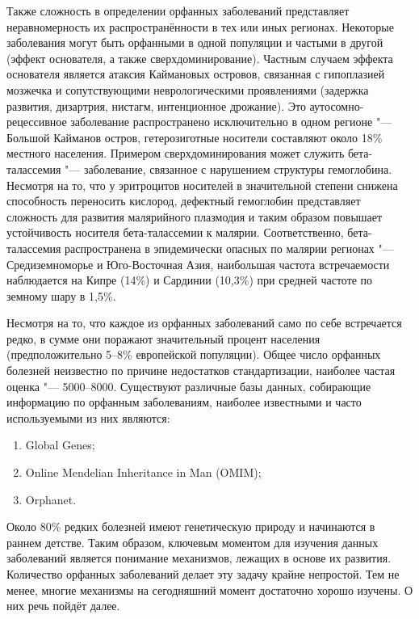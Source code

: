 \documentclass[a4paper,12pt]{article}
\begin{document}
Также сложность в определении орфанных заболеваний представляет неравномерность их распространённости в тех или иных регионах.
Некоторые заболевания могут быть орфанными в одной популяции и частыми в другой (эффект основателя, а также сверхдоминирование).
Частным случаем эффекта основателя является атаксия Каймановых островов, связанная с гипоплазией мозжечка и сопутствующими неврологическими проявлениями (задержка развития, дизартрия, нистагм, интенционное дрожание).
Это аутосомно-рецессивное заболевание распространено исключительно в одном регионе "--- Большой Кайманов остров, гетерозиготные носители составляют около 18\% местного населения\cite{Bomar_2003}.
Примером сверхдоминирования может служить бета-талассемия "--- заболевание, связанное с нарушением структуры гемоглобина.
Несмотря на то, что у эритроцитов носителей в значительной степени снижена способность переносить кислород, дефектный гемоглобин представляет сложность для развития малярийного плазмодия и таким образом повышает устойчивость носителя бета-талассемии к малярии\cite{Galanello_2010}.
Соответственно, бета-талассемия распространена в эпидемически опасных по малярии регионах "--- Средиземноморье и Юго-Восточная Азия, наибольшая частота встречаемости наблюдается на Кипре (14\%) и Сардинии (10,3\%) при средней частоте по земному шару в 1,5\%.

Несмотря на то, что каждое из орфанных заболеваний само по себе встречается редко, в сумме они поражают значительный процент населения (предположительно 5--8\% европейской популяции).
Общее число орфанных болезней неизвестно по причине недостатков стандартизации, наиболее частая оценка "--- 5000--8000\cite{The_Lancet_Neurology_2011}.
Существуют различные базы данных, собирающие информацию по орфанным заболеваниям, наиболее известными и часто используемыми из них являются:

\begin{enumerate}
\item Global Genes;
\item Online Mendelian Inheritance in Man (OMIM\textregistered)\cite{Amberger_2014};
\item Orphanet\cite{Orphanet}.
\end{enumerate}

Около 80\% редких болезней имеют генетическую природу и начинаются в раннем детстве\cite{The_Lancet_Neurology_2011}.
Таким образом, ключевым моментом для изучения данных заболеваний является понимание механизмов, лежащих в основе их развития.
Количество орфанных заболеваний делает эту задачу крайне непростой.
Тем не менее, многие механизмы на сегодняшний момент достаточно хорошо изучены.
О них речь пойдёт далее.
\end{document}
